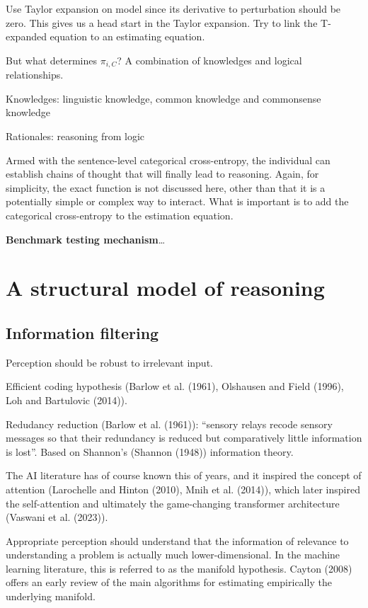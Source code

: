 \documentclass[
]{article}
\begin{document}
Use Taylor expansion on model since its derivative to perturbation
should be zero. This gives us a head start in the Taylor expansion. Try
to link the T-expanded equation to an estimating equation.

But what determines \(\pi_{i, C}\)? A combination of knowledges and
logical relationships.

Knowledges: linguistic knowledge, common knowledge and commonsense
knowledge

Rationales: reasoning from logic

Armed with the sentence-level categorical cross-entropy, the individual
can establish chains of thought that will finally lead to reasoning.
Again, for simplicity, the exact function is not discussed here, other
than that it is a potentially simple or complex way to interact. What is
important is to add the categorical cross-entropy to the estimation
equation.

\textbf{Benchmark testing mechanism}\ldots{}

\section{A structural model of
reasoning}\label{a-structural-model-of-reasoning}

\subsection{Information filtering}\label{information-filtering}

Perception should be robust to irrelevant input.

Efficient coding hypothesis (Barlow et al. (1961), Olshausen and Field
(1996), Loh and Bartulovic (2014)).

Redudancy reduction (Barlow et al. (1961)): ``sensory relays recode
sensory messages so that their redundancy is reduced but comparatively
little information is lost''. Based on Shannon's (Shannon (1948))
information theory.

The AI literature has of course known this of years, and it inspired the
concept of attention (Larochelle and Hinton (2010), Mnih et al. (2014)),
which later inspired the self-attention and ultimately the game-changing
transformer architecture (Vaswani et al. (2023)).

Appropriate perception should understand that the information of
relevance to understanding a problem is actually much lower-dimensional.
In the machine learning literature, this is referred to as the manifold
hypothesis. Cayton (2008) offers an early review of the main algorithms
for estimating empirically the underlying manifold.
\end{document}
